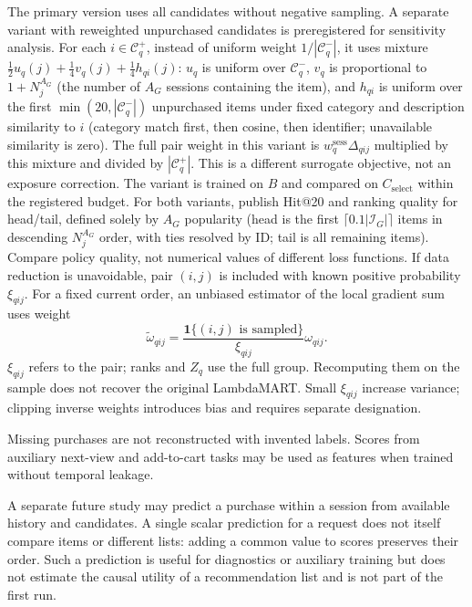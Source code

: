 \documentclass[12pt,a4paper]{article}
\newcommand{\ind}{\mathbf 1}
\theoremstyle{plainru}
\begin{document}
The primary version uses all candidates without negative sampling.
A separate variant with reweighted unpurchased candidates is preregistered
for sensitivity analysis. For each
$i\in\mathcal C_q^+$, instead of uniform weight $1/|\mathcal C_q^-|$,
it uses mixture $\tfrac12u_q(j)+\tfrac14v_q(j)+\tfrac14h_{qi}(j)$:
$u_q$ is uniform over $\mathcal C_q^-$, $v_q$ is proportional to
$1+N_j^{A_G}$ (the number of $A_G$ sessions containing the item), and $h_{qi}$ is uniform
over the first $\min(20,|\mathcal C_q^-|)$ unpurchased items under
fixed category and description similarity to $i$ (category match first,
then cosine, then identifier; unavailable
similarity is zero). The full pair weight in this variant is
$w_q^{\mathrm{sess}}\Delta_{qij}$ multiplied by this mixture
and divided by $|\mathcal C_q^+|$. This is a different surrogate objective,
not an exposure correction. The variant is trained on $B$ and compared
on $C_{\mathrm{select}}$ within the registered budget.
For both variants, publish Hit@20 and ranking quality
for head/tail, defined solely by $A_G$ popularity
(head is the first $\lceil0.1|\mathcal I_G|\rceil$ items
in descending $N_j^{A_G}$ order, with ties resolved by ID;
tail is all remaining items). Compare policy quality,
not numerical values of different loss functions.
If data reduction is unavoidable, pair $(i,j)$ is included
with known positive probability $\xi_{qij}$.
For a fixed current order, an unbiased estimator
of the local gradient sum uses weight
\begin{equation}\label{eq:model-pair-sampling}
\widetilde\omega_{qij}=
\frac{\ind\{(i,j)\text{ is sampled}\}}{\xi_{qij}}
\omega_{qij}.
\end{equation}
$\xi_{qij}$ refers to the pair; ranks and $Z_q$ use the full group.
Recomputing them on the sample does not recover the original LambdaMART.
Small $\xi_{qij}$ increase variance; clipping inverse weights
introduces bias and requires separate designation.

Missing purchases are not reconstructed with invented labels.
Scores from auxiliary next-view and add-to-cart tasks
may be used as features when trained without temporal leakage.

A separate future study may predict a purchase within a session
from available history and candidates. A single scalar prediction for a request
does not itself compare items or different lists: adding
a common value to scores preserves their order. Such a prediction is useful
for diagnostics or auxiliary training but does not estimate
the causal utility of a recommendation list and is not part of the first run.
\end{document}
